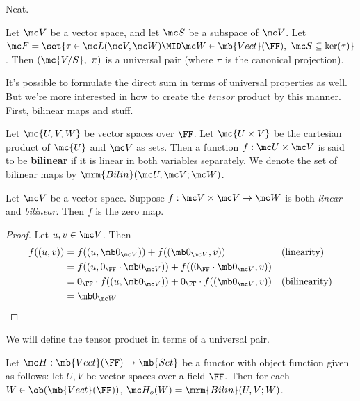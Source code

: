 \documentclass{fkbook}
\theoremstyle{snazzydefinition}
\newenvironment{example}
  {\pushQED{\oldqed}\renewcommand{\qedsymbol}{$\triangle$}\examplex}
  {\popQED\endexamplex}
\begin{document}
  Neat.
  \begin{leftbar}\vspace{-1em}
    \begin{example}[Quotients and projections]
      Let $\mc V$ be a vector space, and let $\mc S$ be a subspace of
      $\mc V$. Let $\mc F = \set{\tau \in \mc L(\mc V, \mc W) \MID
        \mc W \in \mb{Vect}(\FF),\ \mc S \subseteq \ker(\tau)}$. Then
      $(\mc{V/S},\ \pi)$ is a universal pair (where $\pi$ is the
      canonical projection).
    \end{example}
  \end{leftbar}
  It's possible to formulate the direct sum in terms of universal
  properties as well. But we're more interested in how to create the
  \emph{tensor} product by this manner. First, bilinear maps and
  stuff.
  \begin{definition}
    Let $\mc{U,V,W}$ be vector spaces over $\FF$. Let $\mc{U \times
      V}$ be the cartesian product of $\mc{U}$ and $\mc V$ as sets.
    Then a function $f : \mc U \times \mc V$ is said to be
    \textbf{bilinear} if it is linear in both variables separately. We
    denote the set of bilinear maps by $\mrm{Bilin}(\mc U, \mc V; \mc
    W)$.
  \end{definition}
  \begin{theorem}
    Let $\mc V$ be a vector space. Suppose $f : \mc V \times \mc V \to
    \mc W$ is both \emph{linear} and \emph{bilinear}. Then $f$ is the
    zero map.
  \end{theorem}
  \begin{proof}
    Let $u,v \in \mc V$. Then
    \begin{align*}
      f((u,v))
      &= f((u,\mb 0_{\mc V})) + f((\mb 0_{\mc V}, v)) && (\text{linearity}) \\
      &= f((u,0_\FF \cdot \mb 0_{\mc V})) + f((0_\FF \cdot \mb 0_{\mc
        V}, v)) && \\
      &= 0_\FF \cdot f((u,\mb 0_{\mc V})) + 0_\FF \cdot f((\mb 0_{\mc
        V}, v)) && (\text{bilinearity})\\
      &= \mb 0_{\mc W}
    \end{align*}
  \end{proof}
  We will define the tensor product in terms of a universal pair.
  \begin{definition}
    Let $\mc H : \mb{Vect}(\FF) \to \mb{Set}$ be a functor with object
    function given as follows: let $U, V$ be vector spaces over a
    field $\FF$. Then for each $W \in \ob(\mb{Vect}(\FF))$, $\mc
    H_o(W) = \mrm{Bilin}(U, V; W)$.


  \end{definition}
\end{document}
